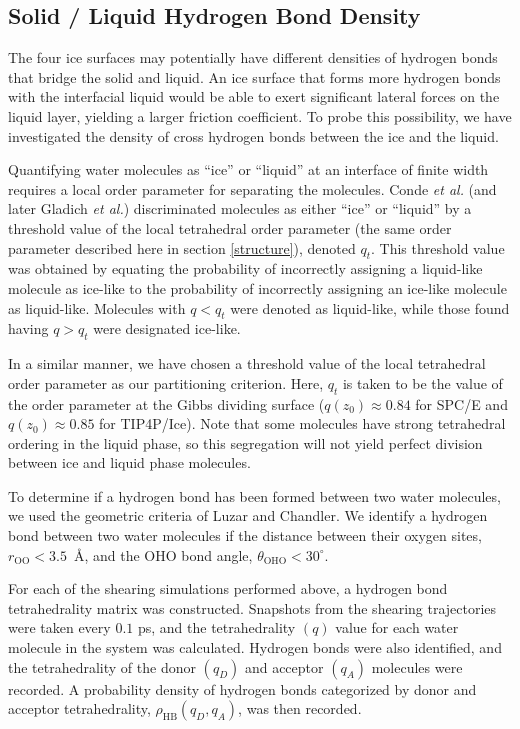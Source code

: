 \subsection{Solid / Liquid Hydrogen Bond Density}
The four ice surfaces may potentially have different densities of
hydrogen bonds that bridge the solid and liquid. An ice surface that
forms more hydrogen bonds with the interfacial liquid would be able to
exert significant lateral forces on the liquid layer, yielding a
larger friction coefficient. To probe this possibility, we have
investigated the density of cross hydrogen bonds between the ice and
the liquid.

Quantifying water molecules as ``ice'' or ``liquid'' at an interface
of finite width requires a local order parameter for separating the
molecules.  Conde \textit{et al.}\cite{Conde2008} (and later Gladich
\textit{et al.}\cite{Gladich2011,Gladich2015}) discriminated molecules
as either ``ice'' or ``liquid'' by a threshold value of the local
tetrahedral order parameter (the same order parameter described here
in section \ref{structure}), denoted $q_{t}$. This threshold value was
obtained by equating the probability of incorrectly assigning a
liquid-like molecule as ice-like to the probability of incorrectly
assigning an ice-like molecule as liquid-like. Molecules with
$q < q_{t}$ were denoted as liquid-like, while those found having
$q > q_{t}$ were designated ice-like.

In a similar manner, we have chosen a threshold value of the local
tetrahedral order parameter as our partitioning criterion. Here,
$q_{t}$ is taken to be the value of the order parameter at the Gibbs
dividing surface ($q(z_0) \approx 0.84$ for SPC/E and
$q(z_0) \approx 0.85$ for TIP4P/Ice).  Note that some molecules have
strong tetrahedral ordering in the liquid phase, so this segregation
will not yield perfect division between ice and liquid phase
molecules.

To determine if a hydrogen bond has been formed between two water
molecules, we used the geometric criteria of Luzar and
Chandler.\cite{Luzar1996} We identify a hydrogen bond between two
water molecules if the distance between their oxygen sites,
$r_\mathrm{OO} < 3.5$~\AA, and the OHO bond angle,
$\theta_\mathrm{OHO} < 30^\circ$.

For each of the shearing simulations performed above, a hydrogen bond
tetrahedrality matrix was constructed.  Snapshots from the shearing
trajectories were taken every $0.1$ ps, and the tetrahedrality $(q)$
value for each water molecule in the system was calculated. Hydrogen
bonds were also identified, and the tetrahedrality of the donor
$(q_{D})$ and acceptor $(q_{A})$ molecules were recorded. A
probability density of hydrogen bonds categorized by donor and
acceptor tetrahedrality, $\rho_\mathrm{HB}(q_D, q_A)$, was then
recorded.

